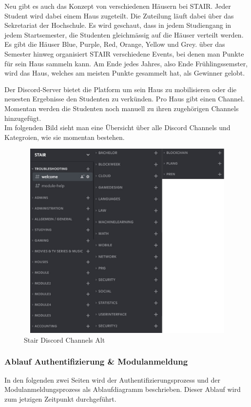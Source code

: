 \documentclass[a4paper, table]{article}
\begin{document}
Neu gibt es auch das Konzept von verschiedenen H\"ausern bei STAIR. Jeder Student wird dabei einem Haus zugeteilt. Die Zuteilung l\"auft
dabei \"uber das Sekretariat der Hochschule. Es wird geschaut, dass in jedem Studiengang in jedem Startsemester, die Studenten gleichm\"assig
auf die H\"auser verteilt werden.
Es gibt die H\"auser Blue, Purple, Red, Orange, Yellow und Grey. \"uber das Semester hinweg organisiert STAIR verschiedene Events, bei denen
man Punkte f\"ur sein Haus sammeln kann. Am Ende jedes Jahres, also Ende Fr\"uhlingssemster, wird das Haus, welches am meisten Punkte
gesammelt hat, als Gewinner gelobt.

Der Discord-Server bietet die Platform um sein Haus zu mobilisieren oder die neuesten Ergebnisse den Studenten zu verk\"unden.
Pro Haus gibt einen Channel. Momentan werden die Studenten noch manuell zu ihren zugeh\"origen Channels hinzugef\"ugt. \\
Im folgenden Bild sieht man eine Übersicht über alle Discord Channels und Kategroien, wie sie momentan bestehen.

\begin{figure}[h]
    \centering
    \includegraphics[width=1.0\textwidth,height=10cm]{img/Stair_Discord_Channels.jpg}
    \caption{Stair Discord Channels Alt}
    \label{fig:stair_old_discord_channels}
\end{figure}

\subsubsection*{Ablauf Authentifizierung \& Modulanmeldung}
In den folgenden zwei Seiten wird der Authentifizierungsprozess und der Modulanmeldungsprozess als Ablaufdiagramm beschrieben.
Dieser Ablauf wird zum jetzigen Zeitpunkt durchgeführt.
\end{document}
